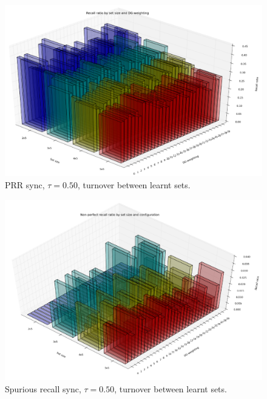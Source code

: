 \begin{figure}
    \centering
    \includegraphics[width=13cm]{fig/3d_perfect_recall_by_set_size_and_dgw_sync_tr_050_tm0}
    \caption{PRR sync, $\tau=0.50$, turnover between learnt sets.}
    \label{fig:3d_perfect_recall_by_set_size_and_dgw_sync_tr_050_tm0}
\end{figure}

\begin{figure}
    \centering
    \includegraphics[width=13cm]{fig/3d_non_perfect_recall_by_set_size_and_dgw_sync_tr_050_tm0_angle_ss}
    \caption{Spurious recall sync, $\tau=0.50$, turnover between learnt sets.}
    \label{fig:3d_non_perfect_recall_by_set_size_and_dgw_sync_tr_050_tm0_angle_ss}
\end{figure}


